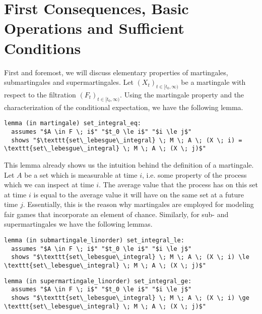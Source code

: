 \section{First Consequences, Basic Operations and Sufficient Conditions}

First and foremost, we will discuss elementary properties of martingales, submartingales and supermartingales. Let $(X_t)_{t \in [t_0,\infty)}$ be a martingale with respect to the filtration $(F_t)_{t \in [t_0,\infty)}$. Using the martingale property and the characterization of the conditional expectation, we have the following lemma.

\begin{isalemma}
{\small
\begin{lstlisting}[style=isabelle]
lemma (in martingale) set_integral_eq:
  assumes "$A \in F \; i$" "$t_0 \le i$" "$i \le j$"
  shows "$\texttt{set\_lebesgue\_integral} \; M \; A \; (X \; i) = \texttt{set\_lebesgue\_integral} \; M \; A \; (X \; j)$"
\end{lstlisting}
}
\end{isalemma}

This lemma already shows us the intuition behind the definition of a martingale. Let $A$ be a set which is measurable at time $i$, i.e. some property of the process which we can inspect at time $i$. The average value that the process has on this set at time $i$ is equal to the average value it will have on the same set at a future time $j$. Essentially, this is the reason why martingales are employed for modeling fair games that incorporate an element of chance. Similarly, for sub- and supermartingales we have the following lemmas.

\begin{isalemma}
{\small
\begin{lstlisting}[style=isabelle]
lemma (in submartingale_linorder) set_integral_le:
  assumes "$A \in F \; i$" "$t_0 \le i$" "$i \le j$"
  shows "$\texttt{set\_lebesgue\_integral} \; M \; A \; (X \; i) \le \texttt{set\_lebesgue\_integral} \; M \; A \; (X \; j)$"
\end{lstlisting}
}
\end{isalemma}

\begin{isalemma}
{\small
\begin{lstlisting}[style=isabelle]
lemma (in supermartingale_linorder) set_integral_ge:
  assumes "$A \in F \; i$" "$t_0 \le i$" "$i \le j$"
  shows "$\texttt{set\_lebesgue\_integral} \; M \; A \; (X \; i) \ge \texttt{set\_lebesgue\_integral} \; M \; A \; (X \; j)$"
\end{lstlisting}
}
\end{isalemma}

